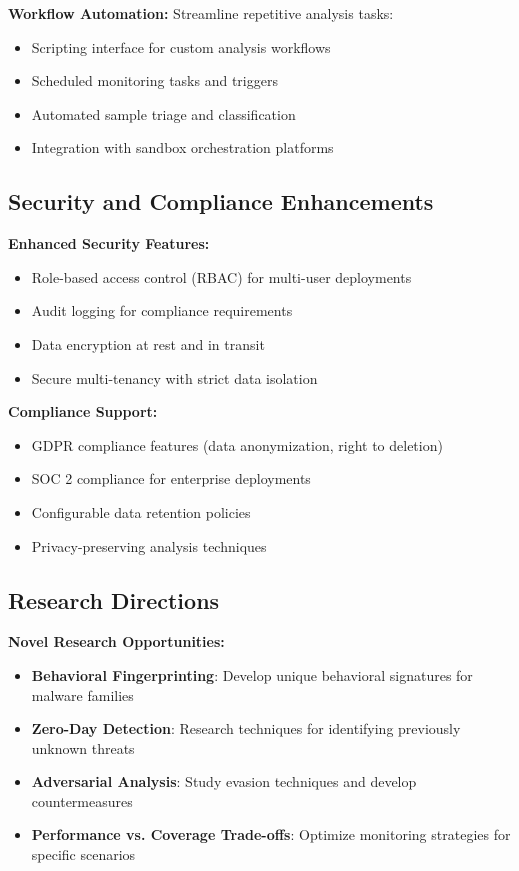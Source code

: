 \textbf{Workflow Automation:}
Streamline repetitive analysis tasks:
\begin{itemize}
    \item Scripting interface for custom analysis workflows
    \item Scheduled monitoring tasks and triggers
    \item Automated sample triage and classification
    \item Integration with sandbox orchestration platforms
\end{itemize}

\subsection{Security and Compliance Enhancements}

\textbf{Enhanced Security Features:}
\begin{itemize}
    \item Role-based access control (RBAC) for multi-user deployments
    \item Audit logging for compliance requirements
    \item Data encryption at rest and in transit
    \item Secure multi-tenancy with strict data isolation
\end{itemize}

\textbf{Compliance Support:}
\begin{itemize}
    \item GDPR compliance features (data anonymization, right to deletion)
    \item SOC 2 compliance for enterprise deployments
    \item Configurable data retention policies
    \item Privacy-preserving analysis techniques
\end{itemize}

\subsection{Research Directions}

\textbf{Novel Research Opportunities:}
\begin{itemize}
    \item \textbf{Behavioral Fingerprinting}: Develop unique behavioral signatures for malware families
    \item \textbf{Zero-Day Detection}: Research techniques for identifying previously unknown threats
    \item \textbf{Adversarial Analysis}: Study evasion techniques and develop countermeasures
    \item \textbf{Performance vs. Coverage Trade-offs}: Optimize monitoring strategies for specific scenarios
\end{itemize}

